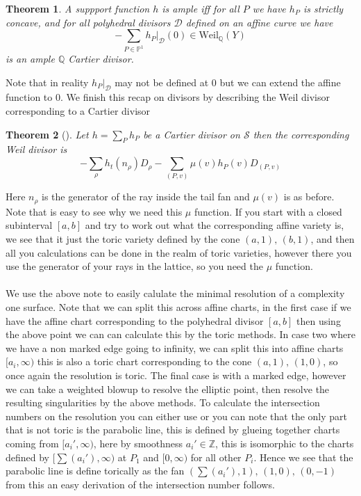 \documentclass[12pt,a4paper]{book}      %
\newtheorem{thm}{Theorem}[section]
\theoremstyle{definition}
\begin{document}
\begin{thm}\cite{Suss}
A suppport function $h$ is ample iff for all $P$ we have $h_P$ is strictly concave, and for all polyhedral divisors $\mathcal{D}$ defined on an affine curve we have
\[
- \sum_{P \in \mathbb{P}^1} h_P |_\mathcal{D} (0) \in \text{Weil}_\mathbb{Q} (Y)
\]
 is an ample $\mathbb{Q}$ Cartier divisor.
\end{thm}
Note that in reality $h_P |_\mathcal{D}$ may not be defined at $0$ but we can extend the affine function to $0$. We finish this recap on divisors by describing the Weil divisor corresponding to a Cartier divisor
\begin{thm}[\cite{PS}]
Let $h = \sum_P h_P$ be a Cartier divisor on $\mathcal{S}$ then the corresponding Weil divisor is 
\[
- \sum_\rho h_t ( n_\rho) D_\rho - \sum_{(P, v)} \mu(v) h_P(v) D_{(P,v)}
\]
\end{thm}
Here $n_\rho$ is the generator of the ray inside the tail fan and $\mu(v)$ is as before. Note that is easy to see why we need this $\mu$ function. If you start with a closed subinterval $[a, b]$ and try to work out what the corresponding affine variety is, we see that it just the toric variety defined by the cone $(a,1), \, (b,1)$, and then all you calculations can be done in the realm of toric varieties, however there you use the generator of your rays in the lattice, so you need the $\mu$ function.
\\
\\
We use the above note to easily calulate the minimal resolution of a complexity one surface. Note that we can split this across affine charts, in the first case if we have the affine chart corresponding to the polyhedral divisor $[a,b]$ then using the above point we can can calculate this by the toric methods. In case two where we have a non marked edge going to infinity, we can split this into affine charts $[a_i, \infty)$ this is also a toric chart corresponding to the cone $(a,1), \, (1,0)$, so once again the resolution is toric. The final case is with a marked edge, however we can take a weighted blowup to resolve the elliptic point, then resolve the resulting singularities by the above methods. To calculate the intersection numbers on the resolution you can either use \cite{Suss} or you can note that the only part that is not toric is the parabolic line, this is defined by glueing together charts coming from $[a_i', \infty)$, here by smoothness $a_i' \in \mathbb{Z}$, this is isomorphic to the charts defined by $[\sum(a_i'), \infty)$ at $P_1$ and $[0, \infty)$ for all other $P_i$. Hence we see that the parabolic line is define torically as the fan  
$(\sum(a_i'), 1), \, (1, 0), \,(0, -1)$ from this an easy derivation of the intersection number follows.
\end{document}
